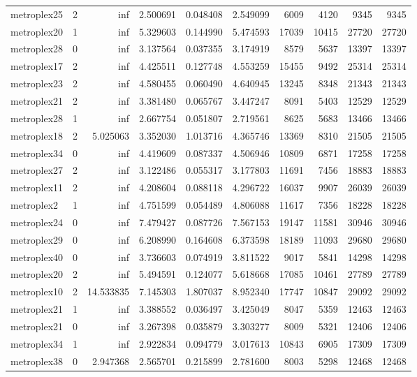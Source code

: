 \begin{longtable}{|l|r|r|r|r|r|r|r|r|r|}
metroplex25 & 2 & inf & 2.500691 & 0.048408 & 2.549099 & 6009 & 4120 & 9345 & 9345 \\
metroplex20 & 1 & inf & 5.329603 & 0.144990 & 5.474593 & 17039 & 10415 & 27720 & 27720 \\
metroplex28 & 0 & inf & 3.137564 & 0.037355 & 3.174919 & 8579 & 5637 & 13397 & 13397 \\
metroplex17 & 2 & inf & 4.425511 & 0.127748 & 4.553259 & 15455 & 9492 & 25314 & 25314 \\
metroplex23 & 2 & inf & 4.580455 & 0.060490 & 4.640945 & 13245 & 8348 & 21343 & 21343 \\
metroplex21 & 2 & inf & 3.381480 & 0.065767 & 3.447247 & 8091 & 5403 & 12529 & 12529 \\
metroplex28 & 1 & inf & 2.667754 & 0.051807 & 2.719561 & 8625 & 5683 & 13466 & 13466 \\
metroplex18 & 2 & 5.025063 & 3.352030 & 1.013716 & 4.365746 & 13369 & 8310 & 21505 & 21505 \\
metroplex34 & 0 & inf & 4.419609 & 0.087337 & 4.506946 & 10809 & 6871 & 17258 & 17258 \\
metroplex27 & 2 & inf & 3.122486 & 0.055317 & 3.177803 & 11691 & 7456 & 18883 & 18883 \\
metroplex11 & 2 & inf & 4.208604 & 0.088118 & 4.296722 & 16037 & 9907 & 26039 & 26039 \\
metroplex2 & 1 & inf & 4.751599 & 0.054489 & 4.806088 & 11617 & 7356 & 18228 & 18228 \\
metroplex24 & 0 & inf & 7.479427 & 0.087726 & 7.567153 & 19147 & 11581 & 30946 & 30946 \\
metroplex29 & 0 & inf & 6.208990 & 0.164608 & 6.373598 & 18189 & 11093 & 29680 & 29680 \\
metroplex40 & 0 & inf & 3.736603 & 0.074919 & 3.811522 & 9017 & 5841 & 14298 & 14298 \\
metroplex20 & 2 & inf & 5.494591 & 0.124077 & 5.618668 & 17085 & 10461 & 27789 & 27789 \\
metroplex10 & 2 & 14.533835 & 7.145303 & 1.807037 & 8.952340 & 17747 & 10847 & 29092 & 29092 \\
metroplex21 & 1 & inf & 3.388552 & 0.036497 & 3.425049 & 8047 & 5359 & 12463 & 12463 \\
metroplex21 & 0 & inf & 3.267398 & 0.035879 & 3.303277 & 8009 & 5321 & 12406 & 12406 \\
metroplex34 & 1 & inf & 2.922834 & 0.094779 & 3.017613 & 10843 & 6905 & 17309 & 17309 \\
metroplex38 & 0 & 2.947368 & 2.565701 & 0.215899 & 2.781600 & 8003 & 5298 & 12468 & 12468 \\

\end{longtable}

